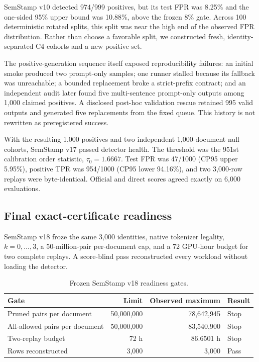 \documentclass[10pt]{article}
\begin{document}
SemStamp v10 detected 974/999 positives, but its test FPR was 8.25\% and the
one-sided 95\% upper bound was 10.88\%, above the frozen 8\% gate.
Across 100 deterministic rotated splits, this split was near the high end of
the observed FPR distribution. Rather than choose a favorable split, we
constructed fresh, identity-separated C4 cohorts and a new positive set.

The positive-generation sequence itself exposed reproducibility failures:
an initial smoke produced two prompt-only samples; one runner stalled because
its fallback was unreachable; a bounded replacement broke a strict-prefix
contract; and an independent audit later found five multi-sentence
prompt-only outputs among 1,000 claimed positives. A disclosed post-hoc
validation rescue retained 995 valid outputs and generated five replacements
from the fixed queue. This history is not rewritten as preregistered success.

With the resulting 1,000 positives and two independent 1,000-document null
cohorts, SemStamp v17 passed detector health. The threshold was the 951st
calibration order statistic, $\tau_0=1.6667$. Test FPR was 47/1000
(CP95 upper 5.95\%), positive TPR was 954/1000 (CP95 lower 94.16\%), and two
3,000-row replays were byte-identical. Official and direct scores agreed
exactly on 6,000 evaluations.

\subsection{Final exact-certificate readiness}

SemStamp v18 froze the same 3,000 identities, native tokenizer legality,
$k=0,\ldots,3$, a 50-million-pair per-document cap, and a 72 GPU-hour budget
for two complete replays. A score-blind pass reconstructed every workload
without loading the detector.

\begin{table}[t]
\caption{Frozen SemStamp v18 readiness gates.}
\label{tab:v18}
\centering
\begin{tabular}{lrrl}
\toprule
Gate & Limit & Observed maximum & Result \\
\midrule
Pruned pairs per document & 50,000,000 & 78,642,945 & Stop \\
All-allowed pairs per document & 50,000,000 & 83,540,900 & Stop \\
Two-replay budget & 72 h & 86.6501 h & Stop \\
Rows reconstructed & 3,000 & 3,000 & Pass \\
\bottomrule
\end{tabular}
\end{table}
\end{document}
